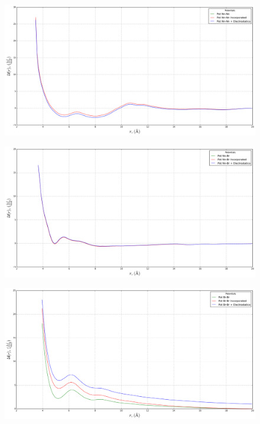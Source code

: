 \documentclass[10pt,a4paper,twoside]{article}
\begin{document}
\begin{figure}[H]
  \begin{center}
	\includegraphics[width=0.8 \textwidth]{./graphs/PtsChargedSys7}
  \end{center}
\end{figure}

\begin{figure}[H]
  \begin{center}
	\includegraphics[width=0.8 \textwidth]{./graphs/PtsChargedSys8}
  \end{center}
\end{figure}

\begin{figure}[H]
  \begin{center}
	\includegraphics[width=0.8 \textwidth]{./graphs/PtsChargedSys9}
  \end{center}
\end{figure}
\end{document}
